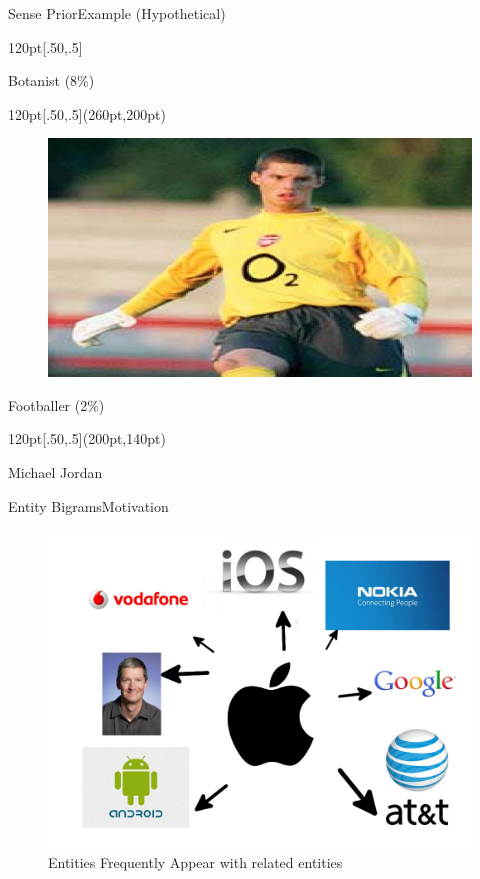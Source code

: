 \begin{frame}{Sense Prior}{Example (Hypothetical)}
\begin{textblock*}{120pt}[.50,.5]
\begin{figure}[h]
\end{figure}
\centering
Botanist (8\%)
\end{textblock*}
  \begin{textblock*}{120pt}[.50,.5](260pt,200pt)
  \begin{figure}[h]
 \includegraphics[bb=0 0 200 150, scale=0.16]{./footballer.jpg}
\end{figure}
\centering
Footballer (2\%)
\end{textblock*}
  \begin{textblock*}{120pt}[.50,.5](200pt,140pt)

\large{Michael Jordan}

\end{textblock*}

\end{frame}


\begin{frame}{Entity Bigrams}{Motivation}
 \begin{figure}[h]
 \centering
 \includegraphics[bb=0 0 1024 768, scale=0.25]{./entitycoocc.png}
 \caption{Entities Frequently Appear with related entities}
\end{figure}

\end{frame}

